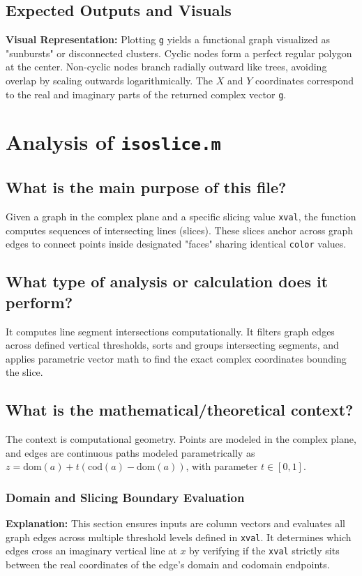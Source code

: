\section{Expected Outputs and Visuals}
\textbf{Visual Representation:} Plotting \texttt{g} yields a functional graph visualized as "sunbursts" or disconnected clusters. Cyclic nodes form a perfect regular polygon at the center. Non-cyclic nodes branch radially outward like trees, avoiding overlap by scaling outwards logarithmically. The $X$ and $Y$ coordinates correspond to the real and imaginary parts of the returned complex vector \texttt{g}.


\newpage
\chapter{Analysis of \texttt{isoslice.m}}

\section{What is the main purpose of this file?}
Given a graph in the complex plane and a specific slicing value \texttt{xval}, the function computes sequences of intersecting lines (slices). These slices anchor across graph edges to connect points inside designated "faces" sharing identical \texttt{color} values.

\section{What type of analysis or calculation does it perform?}
It computes line segment intersections computationally. It filters graph edges across defined vertical thresholds, sorts and groups intersecting segments, and applies parametric vector math to find the exact complex coordinates bounding the slice.

\section{What is the mathematical/theoretical context?}
The context is computational geometry. Points are modeled in the complex plane, and edges are continuous paths modeled parametrically as $z = \text{dom}(a) + t(\text{cod}(a) - \text{dom}(a))$, with parameter $t \in [0, 1]$. 

\subsection{Domain and Slicing Boundary Evaluation}
\textbf{Explanation:} 
This section ensures inputs are column vectors and evaluates all graph edges across multiple threshold levels defined in \texttt{xval}. It determines which edges cross an imaginary vertical line at $x$ by verifying if the \texttt{xval} strictly sits between the real coordinates of the edge's domain and codomain endpoints.

